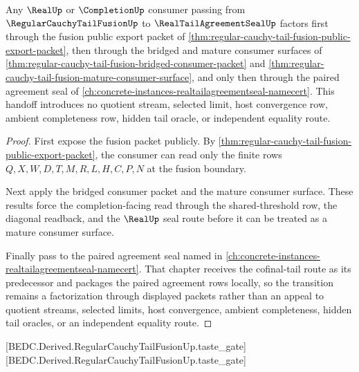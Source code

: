 \begin{theorem}
\label{thm:regular-cauchy-tail-fusion-real-tail-agreement-handoff}
Any $\RealUp$ or $\CompletionUp$ consumer passing from $\RegularCauchyTailFusionUp$ to $\RealTailAgreementSealUp$ factors first through the fusion public export packet of \autoref{thm:regular-cauchy-tail-fusion-public-export-packet}, then through the bridged and mature consumer surfaces of \autoref{thm:regular-cauchy-tail-fusion-bridged-consumer-packet} and \autoref{thm:regular-cauchy-tail-fusion-mature-consumer-surface}, and only then through the paired agreement seal of \autoref{ch:concrete-instances-realtailagreementseal-namecert}. This handoff introduces no quotient stream, selected limit, host convergence row, ambient completeness row, hidden tail oracle, or independent equality route.
\end{theorem}
\begin{proof}
First expose the fusion packet publicly. By \autoref{thm:regular-cauchy-tail-fusion-public-export-packet}, the consumer can read only the finite rows $Q,X,W,D,T,M,R,L,H,C,P,N$ at the fusion boundary.

Next apply the bridged consumer packet and the mature consumer surface. These results force the completion-facing read through the shared-threshold row, the diagonal readback, and the $\RealUp$ seal route before it can be treated as a mature consumer surface.

Finally pass to the paired agreement seal named in \autoref{ch:concrete-instances-realtailagreementseal-namecert}. That chapter receives the cofinal-tail route as its predecessor and packages the paired agreement rows locally, so the transition remains a factorization through displayed packets rather than an appeal to quotient streams, selected limits, host convergence, ambient completeness, hidden tail oracles, or an independent equality route.
\end{proof}

[BEDC.Derived.RegularCauchyTailFusionUp.taste\_gate]
[BEDC.Derived.RegularCauchyTailFusionUp.taste\_gate]

